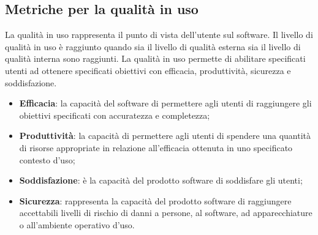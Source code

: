 \subsection{Metriche per la qualità in uso}
La qualità in uso rappresenta il punto di vista dell'utente sul software. Il livello di qualità in uso è raggiunto quando sia il livello di qualità esterna sia il livello di qualità interna sono raggiunti. La qualità in uso permette di abilitare specificati utenti ad ottenere specificati obiettivi con efficacia, produttività, sicurezza e soddisfazione.
\begin{itemize}

    \item \textbf{Efficacia}: la capacità del software di permettere agli utenti di raggiungere gli obiettivi specificati con accuratezza e completezza;
    
    \item \textbf{Produttività}: la capacità di permettere agli utenti di spendere una quantità di risorse appropriate in relazione all'efficacia ottenuta in uno specificato contesto d'uso;
    
    \item \textbf{Soddisfazione}: è la capacità del prodotto software di soddisfare gli utenti;
    
    \item \textbf{Sicurezza}: rappresenta la capacità del prodotto software di raggiungere accettabili livelli di rischio di danni a persone, al software, ad apparecchiature o all'ambiente operativo d'uso.
    
\end{itemize}

